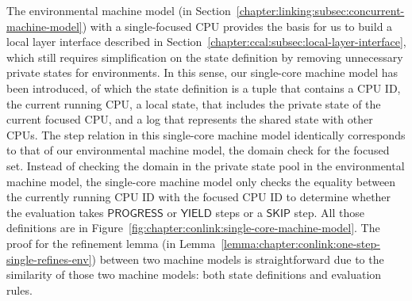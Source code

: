 The environmental machine model 
(in Section~\ref{chapter:linking:subsec:concurrent-machine-model})
 with a single-focused CPU provides the 
basis for us to build a local layer interface described in Section~\ref{chapter:ccal:subsec:local-layer-interface},
which still requires simplification on the state definition by 
removing unnecessary private states for environments. 
In this sense, our single-core machine model has been introduced,
of which the state definition is a tuple that contains 
a CPU ID, the current running CPU, 
a local state, that includes the private state of the current focused CPU,
and a log that represents the shared state with other CPUs. 
The step relation in this single-core machine model identically corresponds to that of our environmental machine model,
the domain check for the focused set. 
Instead of checking the domain in the private state pool in the environmental machine model, 
the single-core machine model only checks the equality between the currently running CPU ID with the focused CPU ID to determine whether the evaluation takes $\textsf{PROGRESS}$ or $\textsf{YIELD}$ steps or a $\textsf{SKIP}$ step. 
All those definitions are in Figure~\ref{fig:chapter:conlink:single-core-machine-model}.
The proof for the refinement lemma (in Lemma~\ref{lemma:chapter:conlink:one-step-single-refines-env}) between two machine models is straightforward due to the similarity of those two machine models: both state definitions and evaluation rules. 

%
%


